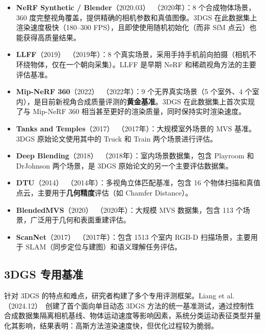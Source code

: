 \begin{itemize}
\item \textbf{NeRF Synthetic / Blender}（2020.03）~\cite{2003_10204}（2020年）：8 个合成物体场景，360 度完整视角覆盖，提供精确的相机参数和真值图像。3DGS 在此数据集上渲染速度极快（180--300 FPS），且即使使用随机初始化（而非 SfM 点云）也能获得高质量结果。

\item \textbf{LLFF}（2019）~\cite{mildenhall2019llff}（2019年）：8 个真实场景，采用手持手机前向拍摄（相机不环绕物体，仅在一个朝向采集）。LLFF 是早期 NeRF 和稀疏视角方法的主要评估基准。

\item \textbf{Mip-NeRF 360}（2022）~\cite{barron2022mipnerf360}（2022年）：9 个无界真实场景（5 个室外、4 个室内），是目前新视角合成质量评测的\textbf{黄金基准}。3DGS 在此数据集上首次实现了与 Mip-NeRF 360 相当甚至更好的渲染质量，同时保持实时渲染速度。

\item \textbf{Tanks and Temples}（2017）~\cite{knapitsch2017tanks}（2017年）：大规模室外场景的 MVS 基准。3DGS 原始论文使用其中的 Truck 和 Train 两个场景进行评估。

\item \textbf{Deep Blending}（2018）~\cite{hedman2018deep}（2018年）：室内场景数据集，包含 Playroom 和 DrJohnson 两个场景，是 3DGS 原始论文的另一个主要评估数据集。

\item \textbf{DTU}（2014）~\cite{jensen2014large}（2014年）：多视角立体匹配基准，包含 16 个物体扫描和真值点云，主要用于\textbf{几何精度}评估（如 Chamfer Distance）。

\item \textbf{BlendedMVS}（2020）~\cite{yao2020blendedmvs}（2020年）：大规模 MVS 数据集，包含 113 个场景，广泛用于几何和表面重建评估。

\item \textbf{ScanNet}（2017）~\cite{dai2017scannet}（2017年）：包含 1513 个室内 RGB-D 扫描场景，主要用于 SLAM（同步定位与建图）和语义理解任务评估。
\end{itemize}

\subsection{3DGS 专用基准}

针对 3DGS 的特点和难点，研究者构建了多个专用评测框架。Liang et al.（2024.12）~\cite{2412_04457}创建了首个面向单目动态 3DGS 方法的统一基准测试，通过控制性合成数据集隔离相机基线、物体运动速度等影响因素，系统分类运动表征类型并量化其影响，结果表明：高斯方法渲染速度快，但优化过程较为脆弱。

